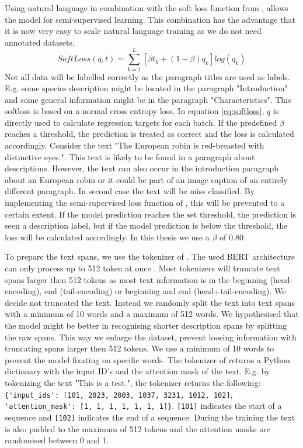 \documentclass[a4paper, 12pt, oneside]{book} %
\begin{document}
Using natural language in combination with the soft loss function from \textcite{reed_training_2015}, allows the model for semi-supervised learning.
This combination has the advantage that it is now very easy to scale natural language training as we do not need annotated datasets.
\begin{equation} \label{eq:softloss}
 SoftLoss(q, t) = \sum_{k=1}^{L}[\beta t _k + (1- \beta )q _k]log(q _k)
\end{equation}
Not all data will be labelled correctly as the paragraph titles are used as labels.
E.g. some species description might be located in the paragraph "Introduction" and some general information might be in the paragraph "Characteristics".
This softloss is based on a normal cross entropy loss.
In equation \ref{eq:softloss}, \(q\) is directly used to calculate regression targets for each batch.
If the predefined \(\beta\) reaches a threshold, the prediction is treated as correct and the loss is calculated accordingly.
Consider the text "The European robin is red-breasted with distinctive eyes.".
This text is likely to be found in a paragraph about descriptions.
However, the text can also occur in the introduction paragraph about an European robin or it could be part of an image caption of an entirely different paragraph. 
In second case the text will be miss classified. 
By implementing the semi-supervised loss function of \textcite{reed_training_2015}, this will be prevented to a certain extent.
If the model prediction reaches the set threshold, the prediction is seen a description label, but if the model prediction is below the threshold, the loss will be calculated accordingly.
In this thesis we use a \(\beta\) of 0.80. 

To prepare the text spans, we use the tokenizer of \textcite{wolf_huggingfaces_2020}.
The used BERT architecture can only process up to 512 token at once \autocite{sanh_distilbert_2020, devlin_bert_2019}.
Most tokenizers will truncate text spans larger then 512 tokens as most text information is in the beginning (head-encoding), end (tail-encoding) or beginning and end (head+tail-encoding).
We decide not truncated the text.
Instead we randomly split the text into text spans with a minimum of 10 words and a maximum of 512 words.
We hypothesised that the model might be better in recognising shorter description spans by splitting the raw spans.  
This way we enlarge the dataset, prevent loosing information with truncating spans larger then 512 tokens. 
We use a minimum of 10 words to prevent the model fixating on specific words.
The tokenizer of \textcite{wolf_huggingfaces_2020} returns a Python dictionary with the input ID's and the attention mask of the text.
E.g. by tokenizing the text "This is a test.", the tokenizer returns the following:
\verb|{'input_ids': [101, 2023, 2003, 1037, 3231, 1012, 102]|, 
\verb|'attention_mask': [1, 1, 1, 1, 1, 1, 1]}|.
\verb|[101]| indicates the start of a sequence and \verb|[102]| indicates the end of a sequence.
During the training the text is also padded to the maximum of 512 tokens and the attention masks are randomised between 0 and 1.
\end{document}
